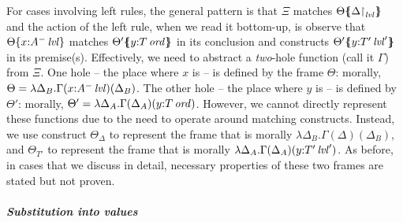 For cases involving left rules, the general pattern is that
$\Xi$ matches ${\Theta}\mbox{$\{\hspace{-4pt}\{$}{\ensuremath{{\Delta}{\upharpoonright}_{{\it lvl}}}}\mbox{$\}\hspace{-4pt}\}$}$ and
the action of the left rule, when we read it bottom-up, is observe that  
${\Theta}\{{x{:}{A^-}\,{{\it lvl}}}\}$ matches 
${\Theta'}\mbox{$\{\hspace{-4pt}\{$}{y{:}{T}\,{{\it ord}}}\mbox{$\}\hspace{-4pt}\}$}$ in its conclusion and constructs 
${\Theta'}\mbox{$\{\hspace{-4pt}\{$}{y{:}{T'}\,{{\it lvl}}'}\mbox{$\}\hspace{-4pt}\}$}$ in its premise(s). 
Effectively, we need to abstract
a {\it two}-hole function (call it $\Gamma$) from $\Xi$. 
One hole -- the place where $x$ is --
is defined by the frame $\Theta$: morally, 
$\Theta = \lambda \Delta_B. \Gamma(x{:}{A^-}\,{{\it lvl}})(\Delta_B)$.
The other hole -- the place where $y$ is -- 
is defined by $\Theta'$: morally,
$\Theta' = \lambda \Delta_A. \Gamma(\Delta_A)(y{:}{T}\,{{\it ord}})$. 
However, we cannot directly represent these functions due to
the need to operate around matching constructs. Instead, we use
construct $\Theta_\Delta$ to represent the frame that is
morally $\lambda \Delta_B. \Gamma(\Delta)(\Delta_B)$, and 
$\Theta_{T'}$ to represent the frame that is morally
$\lambda \Delta_A. \Gamma(\Delta_A)(y{:}{T'}\,{{\it lvl}}')$. As before, in
cases that we discuss in detail, necessary properties of these
two frames are stated but not proven.


\paragraph{\it Substitution into values}

